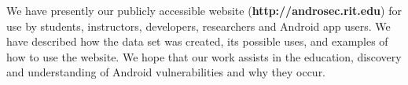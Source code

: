 We have presently our publicly accessible website (\textbf{http://androsec.rit.edu}) for use by students, instructors, developers, researchers and Android app users. We have described how the data set was created, its possible uses, and examples of how to use the website. We hope that our work assists in the education, discovery and understanding of Android vulnerabilities and why they occur.
